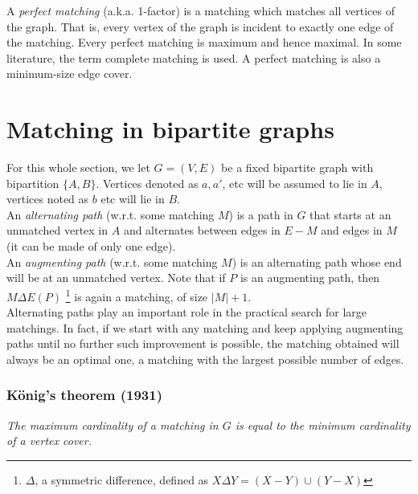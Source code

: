\documentclass[11pt]{book}
\begin{document}
A \textit{perfect matching} (a.k.a. 1-factor) is a matching which matches all vertices of the graph. That is, every vertex of the graph is incident to exactly one edge of the matching. Every perfect matching is maximum and hence maximal. In some literature, the term complete matching is used. A perfect matching is also a minimum-size edge cover. 

\section{Matching in bipartite graphs}
For this whole section, we let $G = (V, E)$ be a fixed bipartite graph with bipartition $\{A, B \}$. Vertices denoted as $a, a'$, etc will be assumed to lie in $A$, vertices noted as $b$ etc will lie in $B$.\\

An \textit{alternating path} (w.r.t. some matching $M$) is a path in $G$ that starts at an unmatched vertex in $A$ and alternates between edges in $E-M$ and edges in $M$ (it can be made of only one edge).\\

An \textit{augmenting path} (w.r.t. some matching $M$) is an alternating path whose end will be at an unmatched vertex. Note that if $P$ is an augmenting path, then $M \Delta E(P)$ \footnote{$\Delta$, a symmetric difference, defined as $X \Delta Y = (X-Y) \cup (Y-X)$} is again a matching, of size $|M| + 1$. \\

Alternating paths play an important role in the practical search for large matchings. In fact, if we start with any matching and keep applying augmenting paths until no further such improvement is possible, the matching obtained will always be an optimal one, a matching with the largest possible number of edges.

\subsubsection{König's theorem (1931)} 

\textit{The maximum cardinality of a matching in $G$ is equal to the minimum cardinality of a vertex cover.}\\
\end{document}

